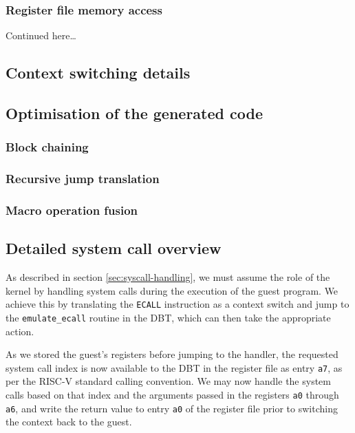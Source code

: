 \subsubsection{Register file memory access}
Continued here\ldots


\subsection{Context switching details}

\subsection{Optimisation of the generated code}
\subsubsection{Block chaining}
\subsubsection{Recursive jump translation}
\subsubsection{Macro operation fusion}

\subsection{Detailed system call overview}

As described in section \vref{sec:syscall-handling}, we must assume the role of the kernel by handling system calls during the execution of the guest program.
We achieve this by translating the \texttt{ECALL} instruction as a context switch and jump to the \texttt{emulate\_ecall} routine in the DBT, which can then take the appropriate action.

As we stored the guest's registers before jumping to the handler, the requested system call index is now available to the DBT in the register file as entry \texttt{a7}, as per the RISC-V standard calling convention.
We may now handle the system calls based on that index and the arguments passed in the registers \texttt{a0} through \texttt{a6}, and write the return value to entry \texttt{a0} of the register file prior to switching the context back to the guest.

